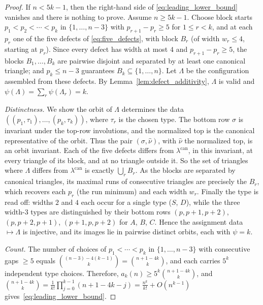 \documentclass[10pt,a4paper]{amsart}
\numberwithin{equation}{section}
\theoremstyle{definition}
\begin{document}
\begin{proof}
	If $n<5k-1$, then the right-hand side of \eqref{eq:leading_lower_bound}
	vanishes and there is nothing to prove. Assume $n\ge 5k-1$.
	Choose block starts $p_1<p_2<\cdots<p_k$ in $\{1,\dots,n-3\}$ with
	$p_{r+1}-p_r\ge 5$ for $1\le r<k$, and at each $p_r$ one of the five defects
	of \eqref{eq:five_defects}, with block $B_r$ (of width $w_r\le 4$, starting
	at $p_r$). Since every defect has width at most $4$ and $p_{r+1}-p_r\ge5$,
	the blocks $B_1,\dots,B_k$ are pairwise disjoint and separated by at least one
	canonical triangle; and $p_k\le n-3$ guarantees $B_k\subseteq\{1,\dots,n\}$.
	Let $\Lambda$ be the configuration assembled from these defects. By
	Lemma~\ref{lem:defect_additivity}, $\Lambda$ is valid and
	$\psi(\Lambda)=\sum_{r}\psi(\Lambda_r)=k$.

	\emph{Distinctness.} We show the orbit of $\Lambda$ determines the data
	$((p_1,\tau_1),\dots,(p_k,\tau_k))$, where $\tau_r$ is the chosen
	type. The bottom row $\sigma$ is invariant under the top-row involutions, and
	the normalized top is the canonical representative of the orbit. Thus the pair
	$ (\sigma,\widehat{\nu} )$, with $\widehat\nu$ the normalized top, is
	an orbit invariant. Each of the five defects differs from
	$\lambda^{\mathrm{can}}$, in this invariant, at every triangle of its block,
	and at no triangle outside it. So the set of triangles where $\Lambda$ differs
	from $\lambda^{\mathrm{can}}$ is exactly $\bigcup_r B_r$. As the blocks are
	separated by canonical triangles, its maximal runs of consecutive triangles
	are precisely the $B_r$, which recovers each $p_r$ (the run minimum) and each
	width $w_r$. Finally the type is read off: widths $2$ and $4$ each occur for a
	single type ($S$, $D$), while the three width-$3$ types are distinguished by
	their bottom rows $(p,p{+}1,p{+}2)$, $(p,p{+}2,p{+}1)$, $(p{+}1,p,p{+}2)$ for
	$A$, $B$, $C$. Hence the assignment data $\mapsto\Lambda$ is injective, and its
	images lie in pairwise distinct orbits, each with $\psi=k$.

	\emph{Count.} The number of choices of $p_1<\cdots<p_k$ in $\{1,\dots,n-3\}$
	with consecutive gaps $\ge5$ equals $\binom{(n-3)-4(k-1)}{k}=\binom{n+1-4k}{k}$,
	and each carries $5^k$ independent type choices. Therefore,
	$a_k(n)\ge 5^k\binom{n+1-4k}{k}$, and
	$\binom{n+1-4k}{k}=\frac{1}{k!}\prod_{j=0}^{k-1}(n+1-4k-j)=\frac{n^k}{k!}+O(n^{k-1})$
	gives~\eqref{eq:leading_lower_bound}.
\end{proof}
\end{document}
